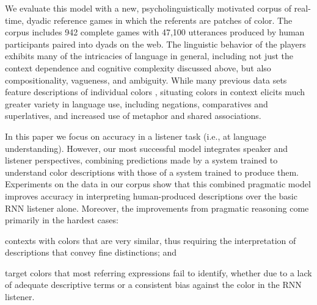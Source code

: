 \documentclass[11pt,letterpaper]{article}
\newcommand{\term}{\textit}
\renewcommand{\|}{\mid}
\begin{document}

We evaluate this model with a new, psycholinguistically motivated corpus of real-time, dyadic reference games in which
the referents are patches of color. 
The corpus includes 942 complete games with 47,100 utterances produced by
human participants paired into dyads on the web. The linguistic
behavior of the players exhibits many of the intricacies of language
in general, including not just the context dependence and cognitive
complexity discussed above, but also compositionality, vagueness, and
ambiguity. While many previous data sets feature descriptions of
individual colors \cite{Cook2005,Munroe2010,Kawakami2016}, situating
colors in context elicits much greater variety in language use,
including negations, comparatives and superlatives, and increased use
of metaphor and shared associations.

In this paper we focus on accuracy in a listener task
(i.e., at language understanding).
However, our most successful model integrates speaker and listener perspectives,
combining predictions made by a system trained to understand color descriptions
with those of a system trained to produce them.
Experiments on the data in our corpus show that this combined pragmatic model
improves accuracy
in interpreting human-produced descriptions over the basic RNN listener
alone. Moreover, the improvements from pragmatic reasoning come primarily
in the hardest cases:
%
\begin{enumerate*}[label=(\arabic*)]
\item contexts with colors that are very similar, thus requiring
  the interpretation of descriptions that convey fine distinctions;
  and
\item target colors that most referring expressions fail to identify,
  whether due to a lack of adequate descriptive terms or a consistent
  bias against the color in the RNN listener.
\end{enumerate*}
\end{document}
